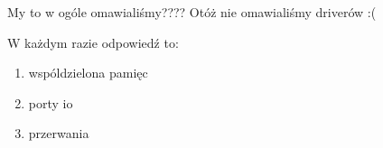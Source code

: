My to w ogóle omawialiśmy????
Otóż nie omawialiśmy driverów :(

W każdym razie odpowiedź to:
\begin{enumerate}
	\item wspóldzielona pamięc
	\item porty io
	\item przerwania
\end{enumerate}
